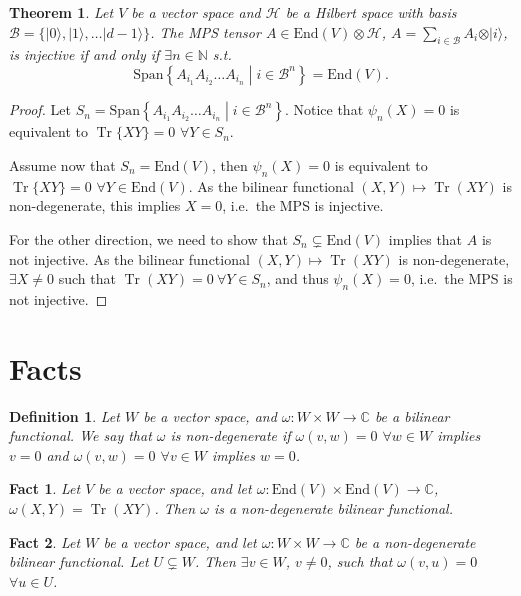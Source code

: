 \documentclass{article}
\newtheorem{fact}{Fact}
\newtheorem{theorem}{Theorem}
\newtheorem{definition}{Definition}
\newcommand{\tr}{\operatorname{Tr}}
\newcommand{\End}{\mathrm{End}}
\newcommand{\ket}[1]{\vert #1 \rangle}
\newcommand{\Span}{\mathrm{Span}}
\begin{document}
\begin{theorem}
  Let $V$ be a vector space and $\mathcal{H}$ be a Hilbert space with basis $\mathcal{B} = \{\ket{0},\ket{1},\dots \ket{d-1}\}$. The MPS tensor $A\in \End(V)\otimes \mathcal{H}$, $A = \sum_{i\in \mathcal{B}} A_i \otimes \ket{i}$, is injective if and only if $\exists n\in \mathbb{N}$ s.t.
  \begin{equation*}
  	\Span\left\{A_{i_1} A_{i_2} \dots A_{i_n} \middle| i\in \mathcal{B}^n \right\} = \End(V).
  \end{equation*}
\end{theorem}

\begin{proof}
	Let $S_n = \Span\left\{A_{i_1} A_{i_2} \dots A_{i_n} \middle| i\in \mathcal{B}^n \right\}$. Notice that $\psi_n(X)=0$ is equivalent to $\tr\{XY\} = 0$ $\forall Y\in S_n$.
  
  Assume now that $S_n = \End(V)$, then $\psi_n(X) = 0$ is equivalent to $\tr \{XY\} = 0 $ $\forall Y\in \End(V)$. As the bilinear functional $(X,Y)\mapsto \tr (XY)$ is non-degenerate, this implies $X=0$, i.e.\ the MPS is injective.
  
  For the other direction, we need to show that $S_n\subsetneq \End(V)$ implies that $A$ is not injective. As the bilinear functional $(X,Y)\mapsto \tr (XY)$ is non-degenerate, $\exists X\neq 0$ such that $\tr (XY) = 0 \ \forall Y\in S_n$, and thus $\psi_n(X) = 0$, i.e.\ the MPS is not injective.
\end{proof}

\appendix

\section{Facts}

\begin{definition}
  Let $W$ be a vector space, and $\omega: W\times W\to \mathbb{C}$ be a bilinear functional.
  We say that $\omega$ is non-degenerate if $\omega(v,w) = 0$ $\forall w\in W$ implies $v=0$ and $\omega(v,w) = 0$ $\forall v\in W$ implies $w=0$.
\end{definition}

\begin{fact}
  Let $V$ be a vector space, and let $\omega: \End(V)\times\End(V)\to \mathbb{C}$, $\omega(X,Y)= \tr(XY)$. Then $\omega$ is a non-degenerate bilinear functional.
\end{fact}


\begin{fact}
  Let $W$ be a vector space, and let $\omega: W\times W\to \mathbb{C}$ be a non-degenerate bilinear functional. Let $U\subsetneq W$. Then $\exists v\in W$, $v\neq 0$, such that  $\omega(v,u) =0$ $\forall u\in U$.
\end{fact}
\end{document}
